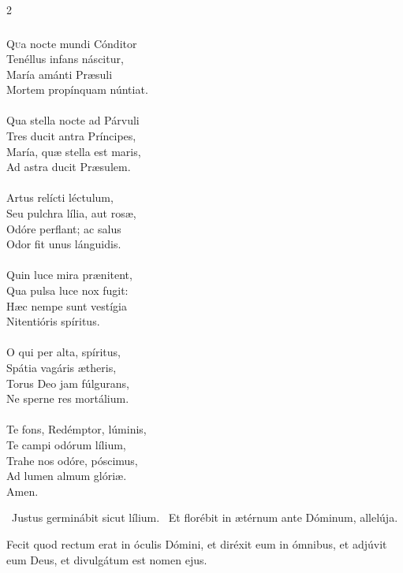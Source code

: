 \documentclass[9pt,twoside]{extarticle}
\begin{document}
\begin{multicols}{2}
\subsubsection*{\center {}}
\begin{center}\end{center}
\lettrine{Q}ua nocte mundi Cónditor\\
Tenéllus infans náscitur,\\
María amánti Præsuli\\
Mortem propínquam núntiat.\\
\\
Qua stella nocte ad Párvuli\\
Tres ducit antra Príncipes,\\
María, quæ stella est maris,\\
Ad astra ducit Præsulem.\\
\\
Artus relícti léctulum,\\
Seu pulchra lília, aut rosæ,\\
Odóre perflant; ac salus\\
Odor fit unus lánguidis.\\
\\
Quin luce mira prænitent,\\
Qua pulsa luce nox fugit:\\
Hæc nempe sunt vestígia\\
Nitentióris spíritus.\\
\\
O qui per alta, spíritus,\\
Spátia vagáris ætheris,\\
Torus Deo jam fúlgurans,\\
Ne sperne res mortálium.\\
\\
Te fons, Redémptor, lúminis,\\
Te campi odórum lílium,\\
Trahe nos odóre, póscimus,\\
Ad lumen almum glóriæ.\\
Amen.

\begin{tightlist}{}
\item {}~Justus germinábit sicut lílium. ~Et florébit in ætérnum ante Dóminum, allelúja.
\item {} Fecit quod rectum erat in óculis Dómini, et diréxit eum in ómnibus, et adjúvit eum Deus, et divulgátum est nomen ejus.
\end{tightlist}


\end{multicols}
\end{document}
